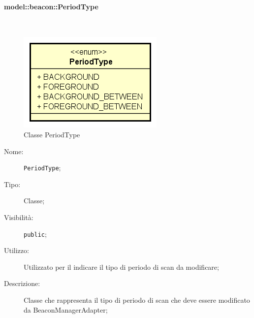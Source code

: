 \documentclass[../DefinizioneDiProdotto.tex]{subfiles}
\begin{document}
\paragraph{model::beacon::PeriodType}
\
\begin{figure}[H]
	\centering
	\includegraphics[width=\maxwidth]{img/PeriodType.png}
	\caption{Classe PeriodType}\label{fig:model::beacon::PeriodType} 
\end{figure}
\begin{description}
	\item[Nome:] \texttt{PeriodType};
	\item[Tipo:] Classe;
	\item[Visibilità:] \texttt{public};
	\item[Utilizzo:] Utilizzato per il indicare il tipo di periodo di scan da modificare;
	\item[Descrizione:] Classe che rappresenta il tipo di periodo di scan che deve essere modificato da BeaconManagerAdapter;
\end{description}
\end{document}
